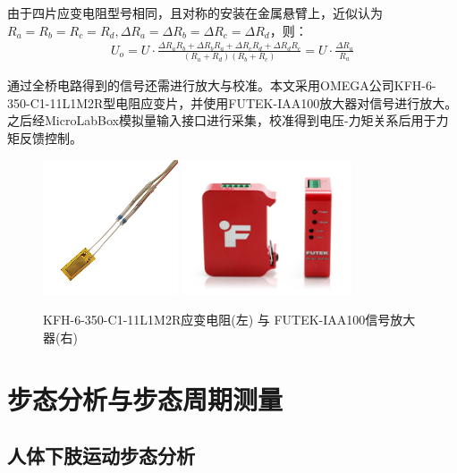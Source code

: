 由于四片应变电阻型号相同，且对称的安装在金属悬臂上，近似认为$R_a = R_b = R_c = R_d,\Delta R_a = \Delta R_b = \Delta R_c = \Delta R_d$，则：
\begin{align}
U_o = U\cdot \frac{\Delta R_a R_b + \Delta R_b R_a + \Delta R_c R_d + \Delta R_d R_c}{(R_a + R_d)(R_b + R_c)}= U\cdot \frac{\Delta R_a}{R_a}
\end{align}

通过全桥电路得到的信号还需进行放大与校准。本文采用OMEGA公司KFH-6-350-C1-11L1M2R型电阻应变片，并使用FUTEK-IAA100放大器对信号进行放大。之后经MicroLabBox模拟量输入接口进行采集，校准得到电压-力矩关系后用于力矩反馈控制。
\begin{figure}[htb]
    \includegraphics[width=4cm]{fig/f28.jpg}\quad\quad
    \includegraphics[width=5cm]{fig/f28.png}
    \caption{KFH-6-350-C1-11L1M2R应变电阻(左) 与 FUTEK-IAA100信号放大器(右)}
    \label{fig:subfigss}
\end{figure}
\section{步态分析与步态周期测量}
\subsection{人体下肢运动步态分析}

